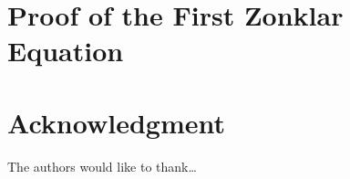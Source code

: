 \documentclass[journal]{IEEEtran}
\begin{document}

%


\appendices{}
\section{Proof of the First Zonklar Equation}
\section*{Acknowledgment}
The authors would like to thank\ldots


\ifCLASSOPTIONcaptionsoff{}
  \newpage
\fi





% 
%







\end{document}
